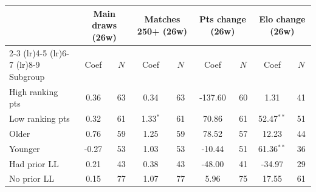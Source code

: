 \begin{tabular}{l cc cc cc cc}
\toprule
 & \multicolumn{2}{c}{Main draws (26w)} & \multicolumn{2}{c}{Matches 250+ (26w)} & \multicolumn{2}{c}{Pts change (26w)} & \multicolumn{2}{c}{Elo change (26w)} \\
\cmidrule(lr){2-3} \cmidrule(lr){4-5} \cmidrule(lr){6-7} \cmidrule(lr){8-9}
Subgroup & Coef & $N$ & Coef & $N$ & Coef & $N$ & Coef & $N$ \\
\midrule
High ranking pts & 0.36 & 63 & 0.34 & 63 & -137.60 & 60 & 1.31 & 41 \\
Low ranking pts & 0.32 & 61 & 1.33$^{*}$ & 61 & 70.86 & 61 & 52.47$^{**}$ & 51 \\
Older & 0.76 & 59 & 1.25 & 59 & 78.52 & 57 & 12.23 & 44 \\
Younger & -0.27 & 53 & 1.03 & 53 & -10.44 & 51 & 61.36$^{**}$ & 36 \\
Had prior LL & 0.21 & 43 & 0.38 & 43 & -48.00 & 41 & -34.97 & 29 \\
No prior LL & 0.15 & 77 & 1.07 & 77 & 5.96 & 75 & 17.55 & 61 \\
\bottomrule
\end{tabular}
